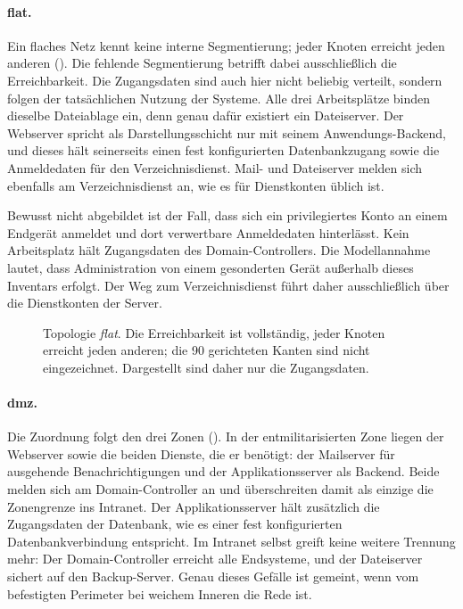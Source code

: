 \medskip\noindent\topolegende

\paragraph{flat.}
Ein flaches Netz kennt keine interne Segmentierung; jeder Knoten erreicht jeden
anderen (). Die fehlende Segmentierung betrifft dabei
ausschließlich die Erreichbarkeit. Die Zugangsdaten sind auch hier nicht
beliebig verteilt, sondern folgen der tatsächlichen Nutzung der Systeme. Alle
drei Arbeitsplätze binden dieselbe Dateiablage ein, denn genau dafür existiert
ein Dateiserver. Der Webserver spricht als Darstellungsschicht nur mit seinem
Anwendungs-Backend, und dieses hält seinerseits einen fest konfigurierten
Datenbankzugang sowie die Anmeldedaten für den Verzeichnisdienst. Mail- und
Dateiserver melden sich ebenfalls am Verzeichnisdienst an, wie es für
Dienstkonten üblich ist.

Bewusst nicht abgebildet ist der Fall, dass sich ein privilegiertes Konto an
einem Endgerät anmeldet und dort verwertbare Anmeldedaten hinterlässt. Kein
Arbeitsplatz hält Zugangsdaten des Domain-Controllers. Die Modellannahme
lautet, dass Administration von einem gesonderten Gerät außerhalb dieses
Inventars erfolgt. Der Weg zum Verzeichnisdienst führt daher ausschließlich
über die Dienstkonten der Server.

\begin{figure}[H]
  \centering
  
  \caption[Topologie \emph{flat}]{Topologie \emph{flat}. Die Erreichbarkeit ist
  vollständig, jeder Knoten erreicht jeden anderen; die 90 gerichteten Kanten
  sind nicht eingezeichnet. Dargestellt sind daher nur die Zugangsdaten.}
  \label{fig:topo-flat}
\end{figure}

\paragraph{dmz.}
Die Zuordnung folgt den drei Zonen (). In der
entmilitarisierten Zone liegen der Webserver sowie die beiden Dienste, die er
benötigt: der Mailserver für ausgehende Benachrichtigungen und der
Applikationsserver als Backend. Beide melden sich am Domain-Controller an und
überschreiten damit als einzige die Zonengrenze ins Intranet. Der
Applikationsserver hält zusätzlich die Zugangsdaten der Datenbank, wie es einer
fest konfigurierten Datenbankverbindung entspricht. Im Intranet selbst greift
keine weitere Trennung mehr: Der Domain-Controller erreicht alle Endsysteme,
und der Dateiserver sichert auf den Backup-Server. Genau dieses Gefälle ist
gemeint, wenn vom befestigten Perimeter bei weichem Inneren die Rede ist.

